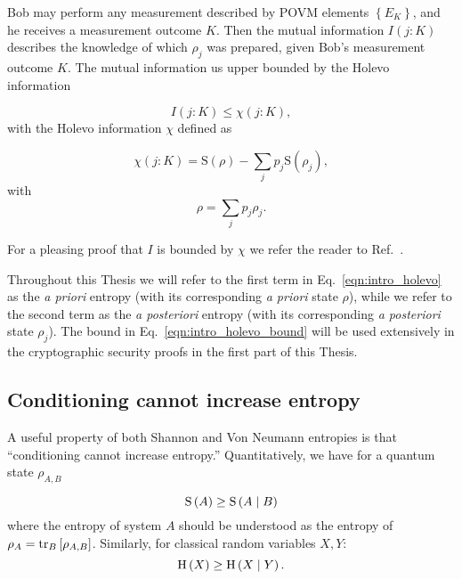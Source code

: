 Bob may perform any measurement described by POVM elements $\left\{E_K\right\}$, and he receives a measurement outcome $K$. Then the mutual information $I\left(j : K\right)$ describes the knowledge of which $\rho_j$ was prepared, given Bob's measurement outcome $K$. The mutual information us upper bounded by the Holevo information

\begin{equation}\label{eqn:intro_holevo_bound}
I\left(j : K \right) \le \chi \left(j : K \right),
\end{equation}
with the Holevo information $\chi$ defined as

\begin{equation}\label{eqn:intro_holevo}
\chi\left(j : K\right)  = \text{S}\left(\rho\right) - \sum_j p_j \text{S}\left(\rho_j\right),
\end{equation}
with
\begin{equation}
\rho = \sum_j p_j \rho_j.
\end{equation}

\noindent For a pleasing proof that $I$ is bounded by $\chi$ we refer the reader to Ref.~\cite{Nielsen2010}. 

Throughout this Thesis we will refer to the first term in Eq.~\ref{eqn:intro_holevo} as the \emph{a priori} entropy (with its corresponding \emph{a priori} state $\rho$), while we refer to the second term as the \emph{a  posteriori} entropy (with its corresponding \emph{a posteriori} state $\rho_j$). The bound in Eq.~\ref{eqn:intro_holevo_bound} will be used extensively in the cryptographic security proofs in the first part of this Thesis.


\FloatBarrier
\subsection{Conditioning cannot increase entropy}

A useful property of both Shannon and Von Neumann entropies is that ``conditioning cannot increase entropy.'' Quantitatively, we have for a quantum state $\rho_{A, B}$

\begin{equation}
\text{S}\left(A\right) \ge \text{S}\left( A \; \middle| \; B \right)
\end{equation}
where the entropy of system $A$ should be understood as the entropy of $\rho_A = \tr_B\left[\rho_{A, B}\right]$. Similarly, for classical random variables $X, Y$:
\begin{equation}
\text{H}\left(X\right) \ge \text{H}\left(X \; \middle| \; Y\right).
\end{equation}








